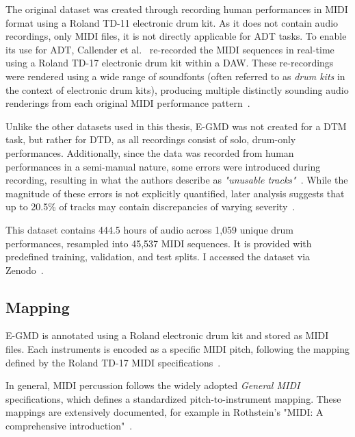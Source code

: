 The original dataset was created through recording human performances in MIDI format using a Roland TD-11 electronic drum kit. As it does not contain audio recordings, only MIDI files, it is not directly applicable for \gls{ADT} tasks. To enable its use for \gls{ADT}, Callender et al.~\cite{callender2020improvingperceptualqualitydrum} re-recorded the MIDI sequences in real-time using a Roland TD-17 electronic drum kit within a \gls{DAW}. These re-recordings were rendered using a wide range of soundfonts (often referred to as \textit{drum kits} in the context of electronic drum kits), producing multiple distinctly sounding audio renderings from each original MIDI performance pattern~\cite{pmlr-v97-gillick19a, callender2020improvingperceptualqualitydrum}.

Unlike the other datasets used in this thesis, E-GMD was not created for a \gls{DTM} task, but rather for \gls{DTD}, as all recordings consist of solo, drum-only performances. Additionally, since the data was recorded from human performances in a semi-manual nature, some errors were introduced during recording, resulting in what the authors describe as \textit{"unusable tracks"}~\cite{callender2020improvingperceptualqualitydrum}. While the magnitude of these errors is not explicitly quantified, later analysis suggests that up to 20.5\% of tracks may contain discrepancies of varying severity~\cite{holz2021automatic}.

This dataset contains 444.5 hours of audio across 1,059 unique drum performances, resampled into 45,537 MIDI sequences. It is provided with predefined training, validation, and test splits. I accessed the dataset via Zenodo~\cite{callender_2020_4300943, callender2020improvingperceptualqualitydrum}.

\subsection{Mapping}

E-GMD is annotated using a Roland electronic drum kit and stored as MIDI files. Each instruments is encoded as a specific MIDI pitch, following the mapping defined by the Roland TD-17 MIDI specifications~\cite{pmlr-v97-gillick19a, callender2020improvingperceptualqualitydrum, roland_drum_midi_td_17}.

In general, MIDI percussion follows the widely adopted \textit{General MIDI} specifications, which defines a standardized pitch-to-instrument mapping. These mappings are extensively documented, for example in Rothstein's "MIDI: A comprehensive introduction"~\cite{rothstein1995midi}.

